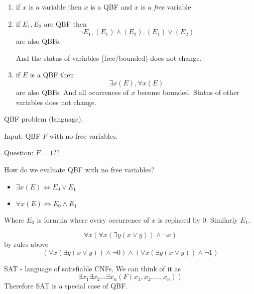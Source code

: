 \begin{definition}
	\begin{enumerate}
		\item if $x$ is a variable then $x$ is a QBF and $x$ is a \emph{free} variable
		\item if $E_1, E_2$ are QBF then
			\[ \neg E_1, (E_1) \land (E_2), (E_1) \lor (E_2) \]
			are also QBFs.

			And the status of variables (free/bounded) does not change.
		\item if $E$ is a QBF then
			\[ \exists x (E), \forall x (E) \]
			are also QBFs. And all ocurrences of $x$ become bounded.
			Status of other variables does not change.
	\end{enumerate}
\end{definition}

\begin{definition}
	QBF problem (language).

	Input: QBF $F$ with no free variables.

	Question: $F = 1$??
\end{definition}

How do we evaluate QBF with no free variables?
\begin{itemize}
	\item $ \exists x (E) \iff E_0 \lor E_1$
	\item $ \forall x (E) \iff E_0 \land E_1$
\end{itemize}
Where $E_0$ is formula where every occurrence of $x$ is replaced by $0$.
Similarly $E_1$.

\begin{example}
	\[ \forall x (\forall x (\exists y (x \lor y)) \land \neg x) \]
	by rules above
	\[ (\forall x (\exists y (x \lor y)) \land \neg 0) \land (\forall x (\exists y (x \lor y)) \land \neg 1) \]
\end{example}

\begin{note}
	SAT - language of satisfiable CNFs.
	We can think of it as
	\[ \exists x_1 \exists x_2 \ldots \exists x_n (F(x_1, x_2, \ldots, x_n)) \]
	Therefore SAT is a special case of QBF.
\end{note}

